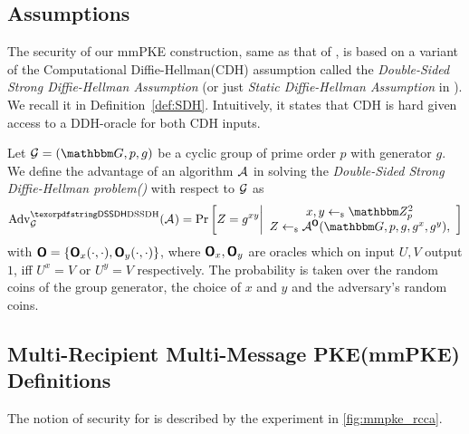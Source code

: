 
\subsection{Assumptions}
The security of our mmPKE construction, same as that of \cite{ASIACCS:PinPoeSch14}, is based on a variant of the Computational
Diffie-Hellman(CDH) assumption called the \emph{Double-Sided Strong Diffie-Hellman Assumption} (or just \emph{Static
  Diffie-Hellman Assumption} in \cite{ASIACCS:PinPoeSch14}). We recall it in Definition~\ref{def:SDH}. Intuitively, it states that
CDH is hard given access to a DDH-oracle for both CDH inputs.

\begin{definition}\label{def:SDH}
  Let $\Group = (\Grp, p, g)$ be a cyclic group of prime order $p$ with generator $g$. We define the advantage of an
  algorithm $\mathcal{A}_{\relax}$ in solving the \emph{Double-Sided Strong Diffie-Hellman problem(\sdh)} with respect to $\mathcal{G}$ as
  \[
    \adv{\sdh}{\Group}(\Adv) =
    \Pr\left[
      Z = g^{xy}
      \middle\vert
      \begin{array}{c}
        x, y \getsr \Z_p^2\\
        Z \getsr \Adv^{\oracle{O}}(\Grp,p,g,g^x,g^y),
      \end{array}
    \right]
  \]
with $\textnormal{\textsf{\bfseries O}} = \{\textnormal{\textsf{\bfseries O}}_x(\cdot,\cdot),\textnormal{\textsf{\bfseries O}}_y(\cdot,\cdot)\}$, where $\textnormal{\textsf{\bfseries O}}_x,\textnormal{\textsf{\bfseries O}}_y$ are oracles which on input $U,V$ output $1$, iff $U^x = V$ or $U^y = V$ respectively.
The probability is taken over the random coins of the group generator, the choice of $x$ and $y$ and the adversary's
random coins.
\end{definition}

\subsection{Multi-Recipient Multi-Message PKE(mmPKE) Definitions}\label{app:mmpke}
The notion of \mmindrcca security for \mmPKE is described by the experiment in \cref{fig:mmpke_rcca}.

